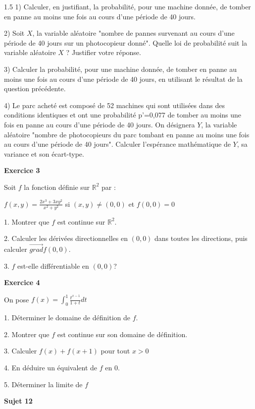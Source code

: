 \documentclass[12pt]{article}
\begin{document}
\begin{spacing}{1.5}
1) Calculer, en justifiant, la probabilité, pour une machine donnée, de tomber en panne au moins une fois au cours d'une période de 40 jours.

2) Soit $X$, la variable aléatoire "nombre de pannes survenant au cours d'une période de 40 jours sur un photocopieur donné". Quelle loi de probabilité suit
 la variable aléatoire $X$ ? Justifier votre réponse.
 
 3) Calculer la probabilité, pour une machine donnée, de tomber en panne au moins une fois au cours d'une période de 40 jours, en utilisant le résultat de la question précédente.
 
 4) Le parc acheté est composé de 52 machines qui sont utilisées dans des conditions identiques et ont une probabilité p'=0,077 de tomber au moins une
 fois en panne au cours d'une période de 40 jours. On désignera $Y$, la variable aléatoire "nombre de photocopieurs du parc tombant en panne au moins une
 fois au cours d'une période de 40 jours". Calculer l'espérance mathématique de $Y$, sa variance et son écart-type.

\medskip \textbf{Exercice 3 }

 Soit $f$ la fonction  définie sur $\mathbb{R}^2$ par :
 
 $
 f(x,y) = \frac{2x^3+3xy^2}{x^2+y^2}$ si $(x,y)\neq (0,0)$ et $f(0,0) = 0$
 
 1. Montrer que $f$ est continue sur $\mathbb{R}^2$.

 2. Calculer les dérivées directionnelles en $(0,0)$ dans toutes les directions, puis calculer $\overrightarrow{grad}f(0,0)$.
 
 3. $f$ est-elle différentiable en $(0,0)$?
 
 \medskip\textbf{Exercice 4}

On pose $f(x)=\int_{0}^{1}\frac{t^{x-1}}{1+t}dt$

1. Déterminer le domaine de définition de $f$.

2. Montrer que $f$ est continue sur son domaine de définition.

3. Calculer $f(x)+f(x+1)$ pour tout $x>0$

4. En déduire un équivalent de $f$ en 0.

5. Déterminer la limite de $f$ 

\quad

\quad
\medskip\textbf{Sujet 12}

\end{spacing}
\end{document}
